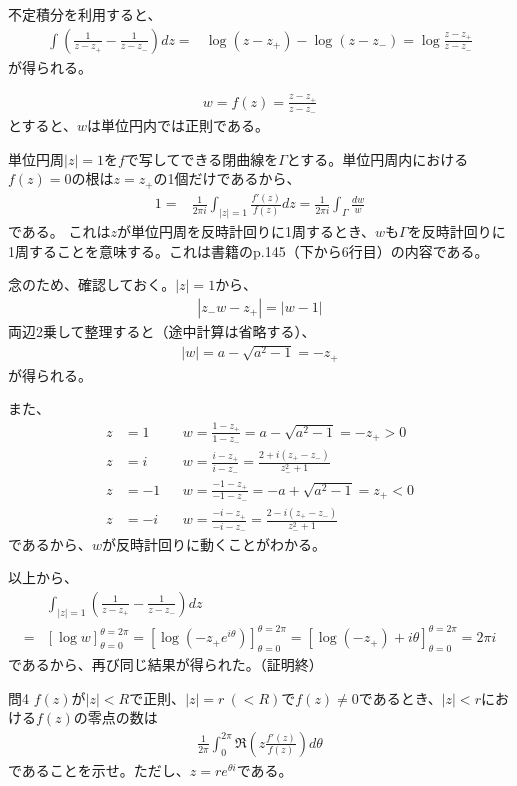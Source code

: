 不定積分を利用すると、
\begin{align*}
    \int\left(\frac{1}{z-z_+}-\frac{1}{z-z_-}\right)dz
    =&\log(z-z_+)-\log(z-z_-)
    =\log\frac{z-z_+}{z-z_-}
\end{align*}
が得られる。

\begin{align*}
    w=f(z)=\frac{z-z_+}{z-z_-}
\end{align*}
とすると、$w$は単位円内では正則である。

単位円周$|z|=1$を$f$で写してできる閉曲線を$\Gamma$とする。単位円周内における$f(z)=0$の根は$z=z_+$の1個だけであるから、
\begin{align*}
    1
    =&\frac{1}{2\pi i}\int_{|z|=1}\frac{f'(z)}{f(z)}dz
    =\frac{1}{2\pi i}\int_{\Gamma}\frac{dw}{w}
\end{align*}
である。
これは$z$が単位円周を反時計回りに1周するとき、$w$も$\Gamma$を反時計回りに1周することを意味する。これは書籍のp.145（下から6行目）の内容である。

念のため、確認しておく。$|z|=1$から、
\begin{align*}
    |z_-w-z_+|=|w-1|
\end{align*}
両辺2乗して整理すると（途中計算は省略する）、
\begin{align*}
    |w|=a-\sqrt{a^2-1}=-z_+
\end{align*}
が得られる。

また、
\begin{align*}
    z&=1& &w=\frac{1-z_+}{1-z_-}=a-\sqrt{a^2-1}=-z_+>0\\
    z&=i& &w=\frac{i-z_+}{i-z_-}=\frac{2+i(z_+-z_-)}{z_-^2+1}\\
    z&=-1& &w=\frac{-1-z_+}{-1-z_-}=-a+\sqrt{a^2-1}=z_+<0\\
    z&=-i& &w=\frac{-i-z_+}{-i-z_-}=\frac{2-i(z_+-z_-)}{z_-^2+1}
\end{align*}
であるから、$w$が反時計回りに動くことがわかる。

以上から、
\begin{align*}
    &\int_{|z|=1}\left(\frac{1}{z-z_+}-\frac{1}{z-z_-}\right)dz\\
    =&\left[\log w\right]_{\theta=0}^{\theta=2\pi}
    =\left[\log(-z_+e^{i\theta})\right]_{\theta=0}^{\theta=2\pi}
    =\left[\log(-z_+)+i\theta\right]_{\theta=0}^{\theta=2\pi}
    =2\pi i
\end{align*}
であるから、再び同じ結果が得られた。（証明終）

\newpage
\begin{mysimplebox}{問4}
    $f(z)$が$|z|<R$で正則、$|z|=r\ (<R)$で$f(z)\neq0$であるとき、$|z|<r$における$f(z)$の零点の数は
    \begin{align*}
        \frac{1}{2\pi}\int_{0}^{2\pi}\Re\left(z\frac{f'(z)}{f(z)}\right)d\theta
    \end{align*}
    であることを示せ。ただし、$z=re^{\theta i}$である。
\end{mysimplebox}
